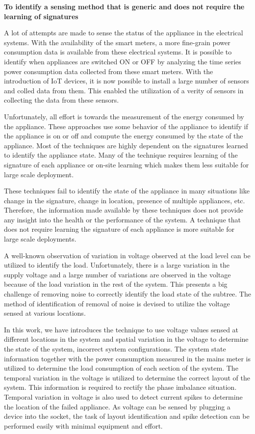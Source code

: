 
\textbf{To identify a sensing method that is generic and does not require the learning of signatures}


A lot of attempts are made to sense the status of the appliance in the electrical systems. With the availability of the smart meters, a more fine-grain power consumption data is available from these electrical systems. It is possible to identify when appliances are switched ON or OFF by analyzing the time series power consumption data collected from these smart meters. With the introduction of IoT devices, it is now possible to install a large number of sensors and colled data from them. This enabled the utilization of a verity of sensors in collecting the data from these sensors. 

Unfortunately, all effort is towards the measurement of the energy consumed by the appliance. These approaches use some behavior of the appliance to identify if the appliance is on or off and compute the energy consumed by the state of the appliance. Most of the techniques are highly dependent on the signatures learned to identify the appliance state. Many of the technique requires learning of the signature of each appliance or on-site learning which makes them less suitable for large scale deployment.

These techniques fail to identify the state of the appliance in many situations like change in the signature, change in location, presence of multiple appliances, etc. Therefore, the information made available by these techniques does not provide any insight into the health or the performance of the system. A technique that does not require learning the signature of each appliance is more suitable for large scale deployments.

A well-known observation of variation in voltage observed at the load level can be utilized to identify the load. Unfortunately, there is a large variation in the supply voltage and a large number of variations are observed in the voltage because of the load variation in the rest of the system. This presents a big challenge of removing noise to correctly identify the load state of the subtree. The method of identification of removal of noise is devised to utilize the voltage sensed at various locations. 

In this work, we have introduces the technique to use voltage values sensed at different locations in the system and spatial variation in the voltage to determine the state of the system, incorrect system configurations. The system state information together with the power consumption measured in the mains meter is utilized to determine the load consumption of each section of the system. The temporal variation in the voltage is utilized to determine the correct layout of the system. This information is required to rectify the phase imbalance situation. Temporal variation in voltage is also used to detect current spikes to determine the location of the failed appliance. As voltage can be sensed by plugging a device into the socket, the task of layout identification and spike detection can be performed easily with minimal equipment and effort.

